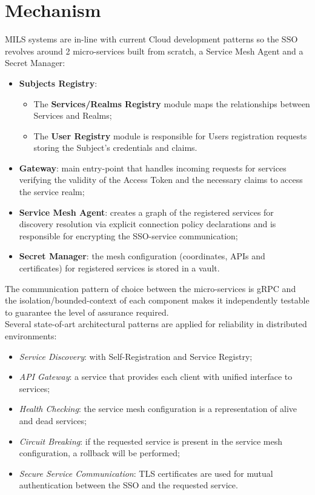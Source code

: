 \documentclass{article}
\begin{document}
\newpage

\section{Mechanism}

MILS systems are in-line with current Cloud development patterns so the SSO revolves around 2 micro-services built from scratch, a Service Mesh Agent and a Secret Manager:
\begin{itemize}
    \item \textbf{Subjects Registry}:
    \begin{itemize}
        \item The \textbf{Services/Realms Registry} module maps the relationships between Services and Realms;
        \item The \textbf{User Registry} module is responsible for Users registration requests storing the Subject's credentials and claims.
    \end{itemize}
    \item \textbf{Gateway}: main entry-point that handles incoming requests for services verifying the validity of the Access Token and the necessary claims to access the service realm;
    \item \textbf{Service Mesh Agent}: creates a graph of the registered services for discovery resolution via explicit connection policy declarations and is responsible for encrypting the SSO-service communication;
    \item \textbf{Secret Manager}: the mesh configuration (coordinates, APIs and certificates) for registered services is stored in a vault.
\end{itemize}



The communication pattern of choice between the micro-services is gRPC and the isolation/bounded-context of each component makes it independently testable to guarantee the level of assurance required.\\

Several state-of-art architectural patterns are applied for reliability in distributed environments:
\begin{itemize}
    \item \textit{Service Discovery}: with Self-Registration and Service Registry;
    \item \textit{API Gateway}: a service that provides each client with unified interface to services;
    \item \textit{Health Checking}: the service mesh configuration is a representation of alive and dead services;
    \item \textit{Circuit Breaking}: if the requested service is present in the service mesh configuration, a rollback will be performed;
    \item \textit{Secure Service Communication}: TLS certificates are used for mutual authentication between the SSO and the requested service.
\end{itemize}
\end{document}
